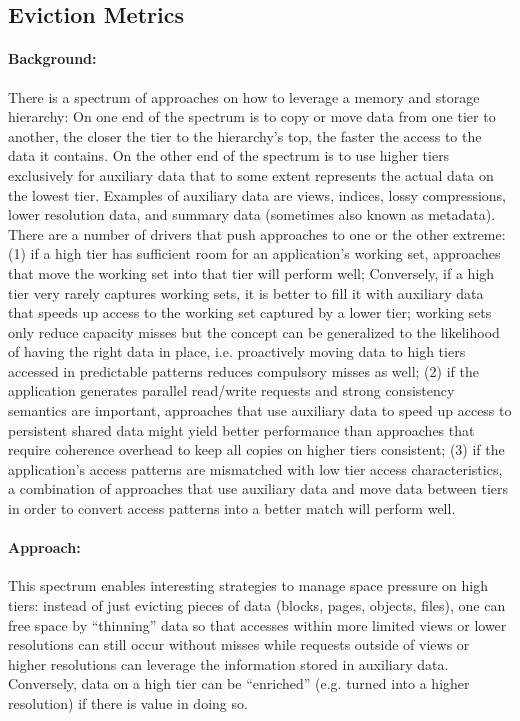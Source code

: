 \subsection{Eviction Metrics}


\paragraph{Background:} There is a spectrum of approaches on how
to leverage a memory and storage hierarchy: On one end of the
spectrum is to copy or move data from one tier to another, the
closer the tier to the hierarchy's top, the faster the access to
the data it contains. On the other end of the spectrum is to use
higher tiers exclusively for auxiliary data that to some extent
represents the actual data on the lowest tier. Examples of auxiliary
data are views, indices, lossy compressions, lower resolution data,
and summary data (sometimes also known as metadata). There are a
number of drivers that push approaches to one or the other extreme:
(1) if a high tier has sufficient room for an application's working
set, approaches that move the working set into that tier will perform
well; Conversely, if a high tier very rarely captures working sets,
it is better to fill it with auxiliary data that speeds up access
to the working set captured by a lower tier; working sets only
reduce capacity misses but the concept can be generalized to the
likelihood of having the right data in place, i.e. proactively
moving data to high tiers accessed in predictable patterns reduces
compulsory misses as well; (2) if the application generates parallel
read/write requests and strong consistency semantics are important,
approaches that use auxiliary data to speed up access to persistent
shared data might yield better performance than approaches that
require coherence overhead to keep all copies on higher tiers
consistent; (3) if the application's access patterns are mismatched
with low tier access characteristics, a combination of approaches
that use auxiliary data and move data between tiers in order to
convert access patterns into a better match will perform well.


\paragraph{Approach:} This spectrum enables interesting strategies
to manage space pressure on high tiers: instead of just evicting
pieces of data (blocks, pages, objects, files), one can free space
by ``thinning'' data so that accesses within more limited views or
lower resolutions can still occur without misses while requests
outside of views or higher resolutions can leverage the information
stored in auxiliary data. Conversely, data on a high tier can be
``enriched'' (e.g. turned into a higher resolution) if there is
value in doing so.

